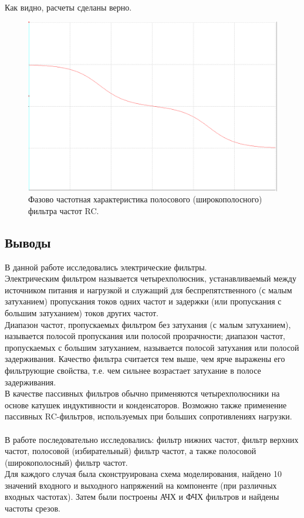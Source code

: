 \documentclass[12pt]{article}
\begin{document}
Как видно, расчеты сделаны верно.

\begin{figure}[H]
    \centering
    \includegraphics[width=\textwidth]{4_pfr.png}
    \caption{Фазово частотная характеристика полосового (широкополосного) фильтра частот RC.}
    \label{fig:4_pfr}
\end{figure}

\subsection*{Выводы}
В данной работе исследовались электрические фильтры. \\
Электрическим фильтром называется четырехполюсник, устанавливаемый между источником питания и нагрузкой и служащий для беспрепятственного (с малым затуханием) пропускания токов одних частот и задержки (или пропускания с большим затуханием) токов других частот.\\
Диапазон частот, пропускаемых фильтром без затухания (с малым затуханием), называется полосой пропускания или полосой прозрачности; диапазон частот, пропускаемых с большим затуханием, называется полосой затухания или полосой задерживания. Качество фильтра считается тем выше, чем ярче выражены его фильтрующие свойства, т.е. чем сильнее возрастает затухание в полосе задерживания.\\
В качестве пассивных фильтров обычно применяются четырехполюсники на основе катушек индуктивности и конденсаторов. Возможно также применение пассивных RC-фильтров, используемых при больших сопротивлениях нагрузки.\\
\ \\
В работе последовательно исследовались: фильтр нижних частот, фильтр верхних частот, полосовой (избирательный) фильтр частот, а также полосовой (широкополосный) фильтр частот. \\
Для каждого случая была сконструирована схема моделирования, найдено 10 значений входного и выходного напряжений на компоненте (при различных входных частотах). Затем были построены АЧХ и ФЧХ фильтров и найдены частоты срезов. \\
\end{document}
